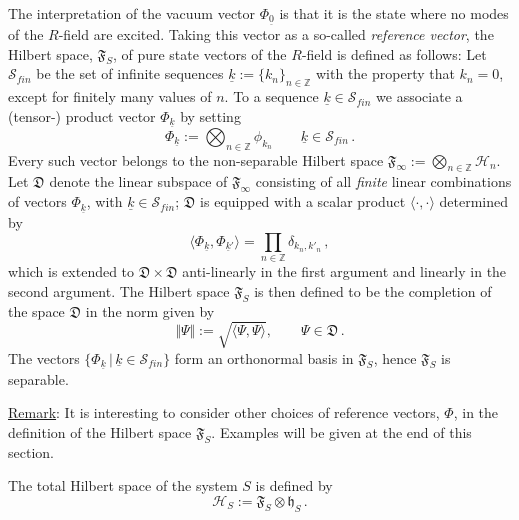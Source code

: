 \documentclass[a4paper,11pt]{article}
\begin{document}
\begin{enumerate}
{The interpretation of the vacuum vector $\Phi_{\underline{0}}$ is that it is the state where no modes of the $R$-field 
are excited. Taking this vector as a so-called \textit{reference vector}, the Hilbert space, $\mathfrak{F}_{S}$, 
of pure state vectors of the $R$-field is defined as follows: 
Let $\mathcal{S}_{fin}$ be the set of infinite sequences 
$\underline{k}:= \big\{k_n\big\}_{n\in \mathbb{Z}}$ with the property that $k_n =0$, except for finitely many values 
of $n$. To a sequence $\underline{k}\in \mathcal{S}_{fin}$ we associate a (tensor-) product vector $\Phi_{\underline{k}}$ by setting
\begin{equation}\label{CONS}
\Phi_{\underline{k}}:= \bigotimes_{n\in \mathbb{Z}} \phi_{k_n}\qquad \underline{k} \in \mathcal{S}_{fin}\,.
\end{equation}
Every such vector belongs to the non-separable Hilbert space 
$\mathfrak{F}_{\infty}:=\bigotimes_{n\in \mathbb{Z}} \mathcal{H}_n$. Let 
$\mathfrak{D}$ denote the linear subspace of $\mathfrak{F}_{\infty}$ consisting of all \textit{finite} linear combinations of 
vectors $\Phi_{\underline{k}}$, with $\underline{k}\in \mathcal{S}_{fin}$; $\mathfrak{D}$ is equipped with a scalar product 
$\langle \cdot, \cdot \rangle$ determined by
\begin{equation}\label{scalar prod}
\langle \Phi_{\underline{k}}, \Phi_{\underline{k}'}\rangle = \prod_{n \in \mathbb{Z}} \delta_{k_n, k'_n}\,,
\end{equation}
which is extended to $\mathfrak{D}\times \mathfrak{D}$ anti-linearly in the first argument and linearly in the second argument. 
The Hilbert space $\mathfrak{F}_{S}$ is then defined to be the completion of the space $\mathfrak{D}$ in the norm given by 
$$\Vert \Psi \Vert:= \sqrt{\langle \Psi, \Psi \rangle}, \qquad \Psi \in \mathfrak{D}\,.$$
The vectors $\big\{\Phi_{\underline{k}}\,\vert\, \underline{k}\in \mathcal{S}_{fin}\big\}$ form an orthonormal basis in 
$\mathfrak{F}_S$, hence $\mathfrak{F}_S$ is separable.

\underline{Remark}: It is interesting to consider other choices of reference vectors, $\Phi$, in the definition of the Hilbert space 
$\mathfrak{F}_S$. Examples will be given at the end of this section.

The total Hilbert space of the system $S$ is defined by
\begin{equation}
\mathcal{H}_S:= \mathfrak{F}_{S}\otimes \mathfrak{h}_S\,.
\end{equation}
}
\end{enumerate}
\end{document}
